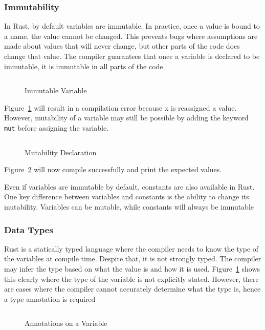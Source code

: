 \documentclass{article}
\newcommand{\rust}[1]{\inputminted{rust}{samples/rust/#1.rs}}
\newcommand{\rustin}[1]{\texttt{#1}}
\begin{document}
  \subsubsection{Immutability}
  In Rust, by default variables are immutable. In practice, once a value is
  bound to a name, the value cannot be changed. This prevents bugs where
  assumptions are made about values that will never change, but other parts of
  the code does change that value. The compiler guarantees that once a variable
  is declared to be immutable, it is immutable in all parts of the code.

  \begin{figure}[ht]
    \rust{immutability}
    \caption{Immutable Variable}
    \label{fig:immut}
  \end{figure}

  Figure~\ref{fig:immut} will result in a compilation error because x is
  reassigned a value. However, mutability of a variable may still be possible by
  adding the keyword \rustin{mut} before assigning the variable.

  \begin{figure}[ht]
    \rust{mutability}
    \caption{Mutability Declaration}
    \label{fig:mut}
  \end{figure}

  Figure~\ref{fig:mut} will now compile successfully and print the expected
  values.

  Even if variables are immutable by default, constants are also available in
  Rust. One key difference between variables and constants is the ability to
  change its mutability. Variables can be mutable, while constants will always
  be immutable

  \subsubsection{Data Types}
  Rust is a statically typed language where the compiler needs to know the type
  of the variables at compile time. Despite that, it is not strongly typed. The
  compiler may infer the type based on what the value is and how it is used.
  Figure~\ref{fig:immut} shows this clearly where the type of the variable is
  not explicitly stated. However, there are cases where the compiler cannot
  accurately determine what the type is, hence a type annotation is required

  \begin{figure}[ht]
    \rust{annotations}
    \caption{Annotations on a Variable}
    \label{fig:annot}
  \end{figure}
\end{document}
